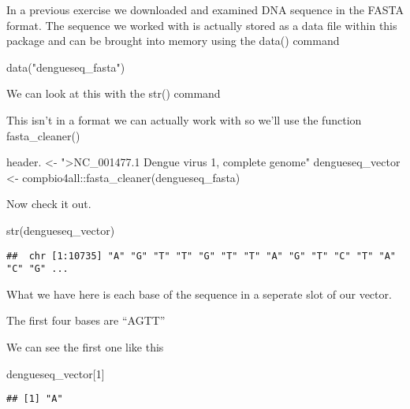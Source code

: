 \documentclass[
]{book}
\newenvironment{Shaded}{\begin{snugshade}}{\end{snugshade}}
\newcommand{\DecValTok}[1]{\textcolor[rgb]{0.00,0.00,0.81}{#1}}
\newcommand{\FunctionTok}[1]{\textcolor[rgb]{0.00,0.00,0.00}{#1}}
\newcommand{\NormalTok}[1]{#1}
\newcommand{\OtherTok}[1]{\textcolor[rgb]{0.56,0.35,0.01}{#1}}
\newcommand{\SpecialCharTok}[1]{\textcolor[rgb]{0.00,0.00,0.00}{#1}}
\newcommand{\StringTok}[1]{\textcolor[rgb]{0.31,0.60,0.02}{#1}}
\begin{document}
In a previous exercise we downloaded and examined DNA sequence in the FASTA format. The sequence we worked with is actually stored as a data file within this package and can be brought into memory using the data() command

\begin{Shaded}
\begin{Highlighting}[]
\FunctionTok{data}\NormalTok{(}\StringTok{"dengueseq\_fasta"}\NormalTok{)}
\end{Highlighting}
\end{Shaded}

We can look at this with the str() command

This isn't in a format we can actually work with so we'll use the function fasta\_cleaner()

\begin{Shaded}
\begin{Highlighting}[]
\NormalTok{header. }\OtherTok{\textless{}{-}} \StringTok{"\textgreater{}NC\_001477.1 Dengue virus 1, complete genome"}
\NormalTok{dengueseq\_vector }\OtherTok{\textless{}{-}}\NormalTok{ compbio4all}\SpecialCharTok{::}\FunctionTok{fasta\_cleaner}\NormalTok{(dengueseq\_fasta)}
\end{Highlighting}
\end{Shaded}

Now check it out.

\begin{Shaded}
\begin{Highlighting}[]
\FunctionTok{str}\NormalTok{(dengueseq\_vector)}
\end{Highlighting}
\end{Shaded}

\begin{verbatim}
##  chr [1:10735] "A" "G" "T" "T" "G" "T" "T" "A" "G" "T" "C" "T" "A" "C" "G" ...
\end{verbatim}

What we have here is each base of the sequence in a seperate slot of our vector.

The first four bases are ``AGTT''

We can see the first one like this

\begin{Shaded}
\begin{Highlighting}[]
\NormalTok{dengueseq\_vector[}\DecValTok{1}\NormalTok{]}
\end{Highlighting}
\end{Shaded}

\begin{verbatim}
## [1] "A"
\end{verbatim}
\end{document}
